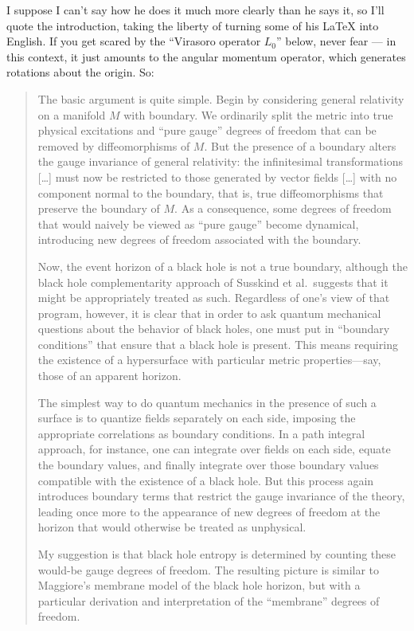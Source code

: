 \documentclass{article}
\begin{document}
I suppose I can't say how he does it much more clearly than he says it,
so I'll quote the introduction, taking the liberty of turning some of
his LaTeX into English. If you get scared by the ``Virasoro operator
\(L_0\)'' below, never fear --- in this context, it just amounts to the
angular momentum operator, which generates rotations about the origin.
So:

\begin{quote}
The basic argument is quite simple. Begin by considering general
relativity on a manifold \(M\) with boundary. We ordinarily split the
metric into true physical excitations and ``pure gauge'' degrees of
freedom that can be removed by diffeomorphisms of \(M\). But the
presence of a boundary alters the gauge invariance of general
relativity: the infinitesimal transformations {[}\ldots{]} must now be
restricted to those generated by vector fields {[}\ldots{]} with no
component normal to the boundary, that is, true diffeomorphisms that
preserve the boundary of \(M\). As a consequence, some degrees of
freedom that would naively be viewed as ``pure gauge'' become dynamical,
introducing new degrees of freedom associated with the boundary.

Now, the event horizon of a black hole is not a true boundary, although
the black hole complementarity approach of Susskind et al.~suggests that
it might be appropriately treated as such. Regardless of one's view of
that program, however, it is clear that in order to ask quantum
mechanical questions about the behavior of black holes, one must put in
``boundary conditions'' that ensure that a black hole is present. This
means requiring the existence of a hypersurface with particular metric
properties---say, those of an apparent horizon.

The simplest way to do quantum mechanics in the presence of such a
surface is to quantize fields separately on each side, imposing the
appropriate correlations as boundary conditions. In a path integral
approach, for instance, one can integrate over fields on each side,
equate the boundary values, and finally integrate over those boundary
values compatible with the existence of a black hole. But this process
again introduces boundary terms that restrict the gauge invariance of
the theory, leading once more to the appearance of new degrees of
freedom at the horizon that would otherwise be treated as unphysical.

My suggestion is that black hole entropy is determined by counting these
would-be gauge degrees of freedom. The resulting picture is similar to
Maggiore's membrane model of the black hole horizon, but with a
particular derivation and interpretation of the ``membrane'' degrees of
freedom.


\end{quote}
\end{document}
